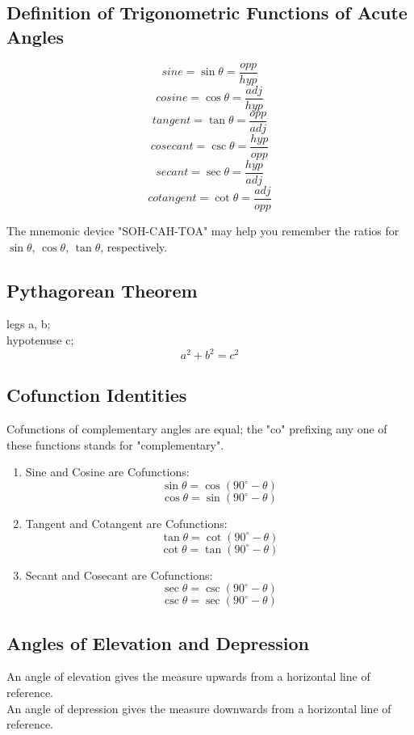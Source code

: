 \documentclass{article}
\begin{document}
\subsection{Definition of Trigonometric Functions of Acute Angles}
\[sine = \sin\theta=\frac{opp}{hyp}\] 
\[cosine = \cos\theta=\frac{adj}{hyp}\]
\[tangent = \tan\theta=\frac{opp}{adj}\]
\[cosecant = \csc\theta=\frac{hyp}{opp}\]
\[secant = \sec\theta=\frac{hyp}{adj}\]
\[cotangent = \cot\theta=\frac{adj}{opp}\]

The mnemonic device "SOH-CAH-TOA" may help you remember the ratios for
$\sin\theta$, $\cos\theta$, $\tan\theta$, respectively. 

\subsection{Pythagorean Theorem}
legs a, b;\\
hypotenuse c;\\
\[a^2+b^2=c^2\]

\subsection{Cofunction Identities}
Cofunctions of complementary angles are equal; the "co" prefixing any one of
these functions stands for "complementary".

\begin{enumerate}
\item Sine and Cosine are Cofunctions:
  \[\sin\theta=\cos(90^{\circ}-\theta)\]
  \[\cos\theta=\sin(90^{\circ}-\theta)\]

\item Tangent and Cotangent are Cofunctions:
  \[\tan\theta=\cot(90^{\circ}-\theta)\]
  \[\cot\theta=\tan(90^{\circ}-\theta)\]

\item Secant and Cosecant are Cofunctions:
  \[\sec\theta=\csc(90^{\circ}-\theta)\]
  \[\csc\theta=\sec(90^{\circ}-\theta)\]

\end{enumerate}

\subsection{Angles of Elevation and Depression}
An angle of elevation gives the measure upwards from a horizontal line of
reference.\\
An angle of depression gives the measure downwards from a horizontal line of
reference.\\
\end{document}
